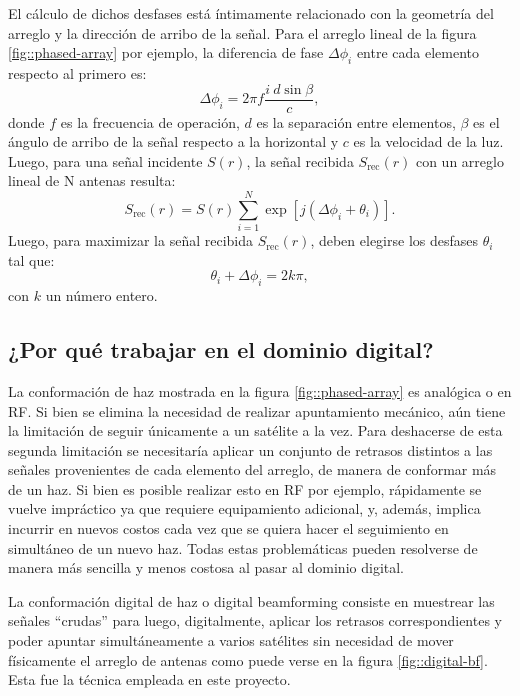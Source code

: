 \documentclass[../../main.tex]{subfiles}
\begin{document}
El cálculo de dichos desfases está íntimamente relacionado con la geometría del arreglo y la dirección de arribo de la señal. Para el arreglo lineal de la figura \ref{fig::phased-array} por ejemplo, la diferencia de fase $\Delta \phi_i$ entre cada elemento respecto al primero es:
\begin{equation}
    \Delta \phi_i = 2 \pi f \frac{i \ d \sin{\beta}}{c},
\end{equation} 
donde $f$ es la frecuencia de operación, $d$ es la separación entre elementos, $\beta$ es el ángulo de arribo de la señal respecto a la horizontal y $c$ es la velocidad de la luz. Luego, para una señal incidente $S(r)$, la señal recibida $S_{\textrm{rec}}(r)$ con un arreglo lineal de N antenas resulta:
\begin{equation}
    S_{\textrm{rec}}(r) = S(r) \sum_{i=1}^{N} \exp[{j (\Delta \phi_i + \theta_i)}].
\end{equation}
Luego, para maximizar la señal recibida $S_{\textrm{rec}}(r)$, deben elegirse los desfases $\theta_i$ tal que:
\begin{equation}
    \theta_i + \Delta \phi_i = 2 k \pi,
\end{equation}
con $k$ un número entero.


\subsection{¿Por qué trabajar en el dominio digital?}

La conformación de haz mostrada en la figura \ref{fig::phased-array} es analógica o en RF. Si bien se elimina la necesidad de realizar apuntamiento mecánico, aún tiene la limitación de seguir únicamente a un satélite a la vez. Para deshacerse de esta segunda limitación se necesitaría aplicar un conjunto de retrasos distintos a las señales provenientes de cada elemento del arreglo, de manera de conformar más de un haz.
Si bien es posible realizar esto en RF  por ejemplo, rápidamente se vuelve impráctico ya que requiere equipamiento adicional, y, además, implica incurrir en nuevos costos cada vez que se quiera hacer el seguimiento en simultáneo de un nuevo haz.
Todas estas problemáticas pueden resolverse de manera más sencilla y menos costosa al pasar al dominio digital. 

La conformación digital de haz o digital beamforming consiste en muestrear las señales ``crudas'' para luego, digitalmente, aplicar los retrasos correspondientes y poder apuntar simultáneamente a varios satélites sin necesidad de mover físicamente el arreglo de antenas como puede verse en la figura \ref{fig::digital-bf}. Esta fue la técnica empleada en este proyecto.
\end{document}
